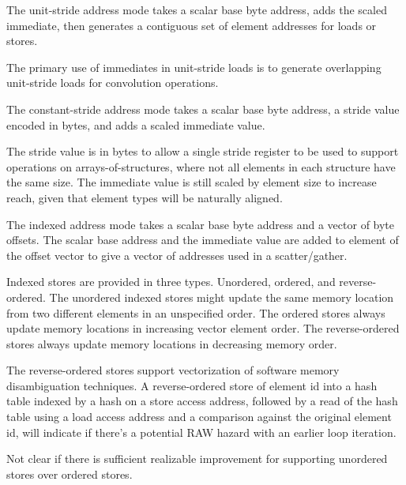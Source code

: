 The unit-stride address mode takes a scalar base byte address, adds
the scaled immediate, then generates a contiguous set of element
addresses for loads or stores.

\begin{commentary}
  The primary use of immediates in unit-stride loads is to generate
  overlapping unit-stride loads for convolution operations.
\end{commentary}

The constant-stride address mode takes a scalar base byte address, a
stride value encoded in bytes, and adds a scaled immediate value.

\begin{commentary}
  The stride value is in bytes to allow a single stride register to be
  used to support operations on arrays-of-structures, where not all
  elements in each structure have the same size.  The immediate value
  is still scaled by element size to increase reach, given that
  element types will be naturally aligned.
\end{commentary}

The indexed address mode takes a scalar base byte address and a vector
of byte offsets.  The scalar base address and the immediate value are
added to element of the offset vector to give a vector of addresses
used in a scatter/gather.

Indexed stores are provided in three types.  Unordered, ordered, and
reverse-ordered.  The unordered indexed stores might update the same
memory location from two different elements in an unspecified order.
The ordered stores always update memory locations in increasing vector
element order.  The reverse-ordered stores always update memory
locations in decreasing memory order.

\begin{commentary}
  The reverse-ordered stores support vectorization of software memory
  disambiguation techniques.  A reverse-ordered store of element id
  into a hash table indexed by a hash on a store access address,
  followed by a read of the hash table using a load access address and
  a comparison against the original element id, will indicate if
  there's a potential RAW hazard with an earlier loop iteration.
\end{commentary}

\begin{discussion}
  Not clear if there is sufficient realizable improvement for
  supporting unordered stores over ordered stores.
\end{discussion}

